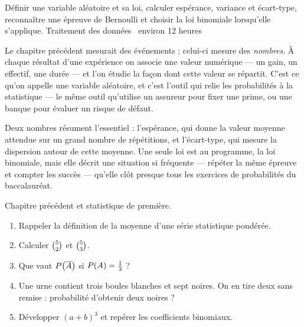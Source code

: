   {Définir une variable aléatoire et sa loi, calculer espérance, variance et
   écart-type, reconnaître une épreuve de Bernoulli et choisir la loi
   binomiale lorsqu'elle s'applique.}
  {Traitement des données \textbullet\ environ 12 heures}

Le chapitre précédent mesurait des événements ; celui-ci mesure des
\emph{nombres}. À chaque résultat d'une expérience on associe une valeur
numérique — un gain, un effectif, une durée — et l'on étudie la façon dont
cette valeur se répartit. C'est ce qu'on appelle une variable aléatoire, et
c'est l'outil qui relie les probabilités à la statistique — le même outil
qu'utilise un assureur pour fixer une prime, ou une banque pour évaluer un
risque de défaut.

Deux nombres résument l'essentiel : l'espérance, qui donne la valeur moyenne
attendue sur un grand nombre de répétitions, et l'écart-type, qui mesure la
dispersion autour de cette moyenne. Une seule loi est au programme, la loi
binomiale, mais elle décrit une situation si fréquente — répéter la même
épreuve et compter les succès — qu'elle clôt presque tous les exercices de
probabilités du baccalauréat.

\begin{revision}
Chapitre précédent et statistique de première.

\begin{enumerate}[label=\textbf{\arabic*.}, leftmargin=*, itemsep=0.35em]
  \item Rappeler la définition de la moyenne d'une série statistique
        pondérée.
  \item Calculer $\combi{2}{5}$ et $\combi{3}{5}$.
  \item Que vaut $\proba{\evtc{A}}$ si $\proba{A} = \frac13$ ?
  \item Une urne contient trois boules blanches et sept noires. On en tire
        deux sans remise : probabilité d'obtenir deux noires ?
  \item Développer $(a+b)^{3}$ et repérer les coefficients binomiaux.
\end{enumerate}
\end{revision}

